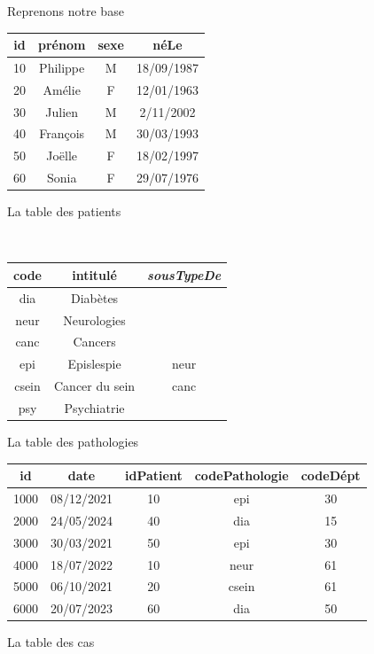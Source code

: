 


\begin{frame}{Reprenons notre base}
 
 \vfill
\begin{small}
\begin{minipage}[t]{7cm}
\begin{tabular}{c|c|c|c}
\textbf{id} & prénom & sexe & néLe \\ \hline
 10  &  Philippe & M & 18/09/1987\\
20 & Amélie & F & 12/01/1963\\
30 &Julien & M & 2/11/2002\\
40 & François & M & 30/03/1993\\
50 & Joëlle & F & 18/02/1997\\
60 & Sonia & F & 29/07/1976\\
\hline
\end{tabular}

La table des patients
\end{minipage} \hspace*{2mm} \
\begin{minipage}[t]{5cm}
\begin{tabular}{c|c|c}
\textbf{code} & intitulé & \textit{sousTypeDe} \\ \hline
dia  & Diabètes &  \\
neur & Neurologies & \\
canc & Cancers & \\
epi & Epislespie & neur \\
csein & Cancer du sein & canc\\
psy & Psychiatrie & \\
\hline
\end{tabular}
La table des pathologies
\end{minipage}

\vfill
\begin{center}
\begin{tabular}{c|c|c|c|c}
\textbf{id} & date & idPatient & codePathologie & codeDépt \\ \hline
1000  & 08/12/2021 & 10 & epi & 30\\
2000 &  24/05/2024 & 40 & dia & 15\\
3000 &  30/03/2021 & 50 & epi & 30\\
4000 &  18/07/2022 & 10 & neur & 61\\
5000 &  06/10/2021 & 20 & csein & 61\\
6000 &  20/07/2023 & 60 & dia & 50\\
\hline
\end{tabular}
La table des cas
\end{center} 

\end{small}
\end{frame}

